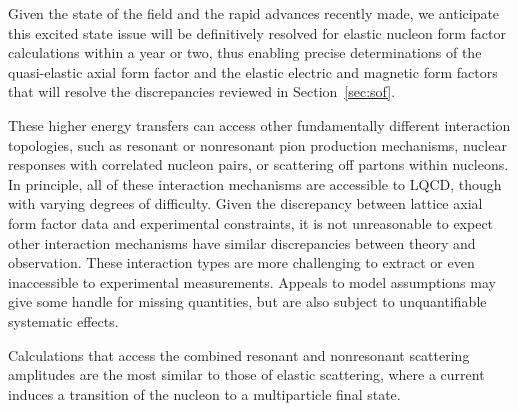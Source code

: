 Given the state of the field and the rapid advances recently made, we anticipate this excited state issue will be definitively resolved for elastic nucleon form factor calculations within a year or two, thus enabling precise determinations of the quasi-elastic axial form factor and the elastic electric and magnetic form factors that will resolve the discrepancies reviewed in Section~\ref{sec:sof}.


These higher energy transfers can access other fundamentally different interaction topologies,
 such as resonant or nonresonant pion production mechanisms,
 nuclear responses with correlated nucleon pairs,
 or scattering off partons within nucleons.
In principle, all of these interaction mechanisms are accessible to LQCD,
 though with varying degrees of difficulty.
Given the discrepancy between lattice axial form factor data and experimental constraints,
 it is not unreasonable to expect other interaction mechanisms have similar discrepancies
 between theory and observation.
These interaction types are more challenging to extract or even inaccessible to
 experimental measurements.
Appeals to model assumptions may give some handle for missing quantities,
 but are also subject to unquantifiable systematic effects.

Calculations that access the combined resonant and nonresonant scattering amplitudes
 are the most similar to those of elastic scattering,
 where a current induces a transition of the nucleon to a multiparticle final state.

